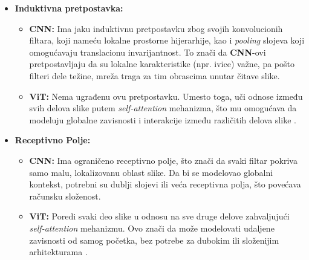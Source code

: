 \documentclass[12pt]{article}
\begin{document}
   \begin{itemize}
      \item \textbf{Induktivna pretpostavka:}
      \begin{itemize}
         \item \textbf{CNN:} Ima jaku induktivnu pretpostavku zbog svojih konvolucionih filtara, 
         koji nameću lokalne prostorne hijerarhije, kao i \textit{pooling} slojeva
         koji omogućavaju translacionu invarijantnost. To znači 
         da \textbf{CNN}-ovi pretpostavljaju da su lokalne karakteristike (npr. ivice) važne, pa pošto
         filteri dele težine, mreža traga za tim obrascima unutar čitave slike.
         \item \textbf{ViT:} Nema ugrađenu ovu pretpostavku. Umesto toga, uči 
         odnose između svih delova slike putem \textit{self-attention} mehanizma, što mu 
         omogućava da modeluju globalne zavisnosti i interakcije između različitih delova slike \cite{vit}.
      \end{itemize}
      \item \textbf{Receptivno Polje:}
      \begin{itemize}
         \item \textbf{CNN:} Ima ograničeno receptivno polje, što znači da svaki filtar pokriva 
         samo malu, lokalizovanu oblast slike. Da bi se modelovao globalni kontekst, potrebni su 
         dublji slojevi ili veća receptivna polja, što povećava računsku složenost.
         \item \textbf{ViT:} Poredi svaki deo slike u odnosu na sve druge delove zahvaljujući
         \textit{self-attention} mehanizmu. Ovo znači da može modelovati udaljene zavisnosti od 
         samog početka, bez potrebe za dubokim ili složenijim arhitekturama \cite{vit}.
      \end{itemize}
   \end{itemize}
\end{document}
